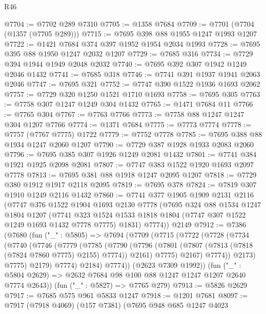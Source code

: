\begin{lexlean}{R46}
\begin{coremodule}
@7704 := @7702 @289 @7310
@7705 := @1358 @7684
@7709 := @7701 (@7704 (@1357 (@7705 @289)))
@7715 := @7695 @398 @88 @1955 @1247 @1993 @1207
@7722 := @1421 @7684 @374 @397 @1952 @1954 @2034 @1993
@7728 := @7695 @395 @88 @1950 @1247 @2032 @1207
@7729 := @7685 @316
@7734 := @7729 @394 @1944 @1949 @2048 @2032
@7740 := @7695 @392 @307 @1942 @1249 @2046 @1432
@7741 := @7685 @318
@7746 := @7741 @391 @1937 @1941 @2063 @2046
@7747 := @7695 @321
@7752 := @7747 @390 @1522 @1936 @1693 @2062
@7757 := @7729 @320 @1250 @1521 @1710 @1693
@7758 := @7695 @305
@7763 := @7758 @307 @1247 @1249 @304 @1432
@7765 := @1471 @7684 @11
@7766 := @7765 @304
@7767 := @7763 @7766
@7773 := @7758 @88 @1247 @1247 @304 @1207 @7766
@7774 := @1371 @7684
@7775 := @7773 @7774
@7778 := @7757 (@7767 @7775) @1722
@7779 := @7752 @7778
@7785 := @7695 @388 @88 @1934 @1247 @2060 @1207
@7790 := @7729 @387 @1928 @1933 @2083 @2060
@7796 := @7695 @385 @307 @1926 @1249 @2081 @1432
@7801 := @7741 @384 @1921 @1925 @2098 @2081
@7807 := @7747 @383 @1522 @1920 @1693 @2097 @7778
@7813 := @7695 @381 @88 @1918 @1247 @2095 @1207
@7818 := @7729 @380 @1912 @1917 @2118 @2095
@7819 := @7695 @378
@7824 := @7819 @307 @1910 @1249 @2116 @1432
@7860 := @7741
    @377
    @1905
    @1909
    @2131
    @2116
    (@7747
      @376
      @1522
      @1904
      @1693
      @2130
      @7778
      (@7695
        @324
        @88
        @1534
        @1247
        @1804
        @1207
        (@7741 @323 @1524 @1533 @1818 @1804 (@7747 @307 @1522 @1249 @1693 @1432 @7778 @7775) @1831)
        @7774))
    @2149
@7912 := @7386
    (@7680
      (fun ("_" : @5805) =>
      @7694
        (@7709
          (@7715
            (@7722
              (@7728
                (@7734
                  (@7740
                    (@7746
                      (@7779
                        (@7785
                          (@7790
                            (@7796
                              (@7801 (@7807 (@7813 (@7818 (@7824 @7860 @7775) @2155) @7774)) @2161)
                              @7775)
                            @2167)
                          @7774))
                      @2173)
                    @7775)
                  @2179)
                @7774)
              @2184)
            @7774))
        (@2623 @7309 @1992))
      (fun ("_" : @5804 @2629) => @2632 @7684 @98 @100 @88 @1247 @1247 @1207 @2640 @7774 @2643))
    (fun ("_" : @5827) => @7765 @279)
@7913 := @5826 @2629
@7917 := @7685 @575 @961 @5833 @1247
@7918 := @1201 @7681
@8097 := @7917
    (@7918 @4069)
    (@157 @7381)
    (@7695
      @948
      @685
      @1247
      @4023

\end{coremodule}
\end{lexlean}
